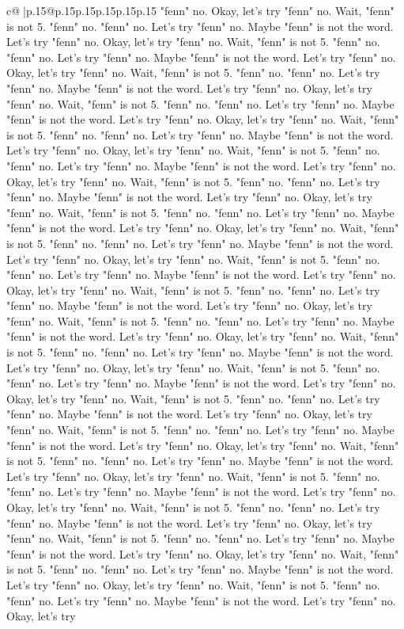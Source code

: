 \documentclass{article}
\begin{document}
{\begin{supertabular}{c@{$\;$}|p{.15\linewidth}@{}p{.15\linewidth}p{.15\linewidth}p{.15\linewidth}p{.15\linewidth}p{.15\linewidth}}
{{{"fenn" no. Okay, let's try "fenn" no. Wait, "fenn" is not 5. "fenn" no. "fenn" no. Let's try "fenn" no. Maybe "fenn" is not the word. Let's try "fenn" no. Okay, let's try "fenn" no. Wait, "fenn" is not 5. "fenn" no. "fenn" no. Let's try "fenn" no. Maybe "fenn" is not the word. Let's try "fenn" no. Okay, let's try "fenn" no. Wait, "fenn" is not 5. "fenn" no. "fenn" no. Let's try "fenn" no. Maybe "fenn" is not the word. Let's try "fenn" no. Okay, let's try "fenn" no. Wait, "fenn" is not 5. "fenn" no. "fenn" no. Let's try "fenn" no. Maybe "fenn" is not the word. Let's try "fenn" no. Okay, let's try "fenn" no. Wait, "fenn" is not 5. "fenn" no. "fenn" no. Let's try "fenn" no. Maybe "fenn" is not the word. Let's try "fenn" no. Okay, let's try "fenn" no. Wait, "fenn" is not 5. "fenn" no. "fenn" no. Let's try "fenn" no. Maybe "fenn" is not the word. Let's try "fenn" no. Okay, let's try "fenn" no. Wait, "fenn" is not 5. "fenn" no. "fenn" no. Let's try "fenn" no. Maybe "fenn" is not the word. Let's try "fenn" no. Okay, let's try "fenn" no. Wait, "fenn" is not 5. "fenn" no. "fenn" no. Let's try "fenn" no. Maybe "fenn" is not the word. Let's try "fenn" no. Okay, let's try "fenn" no. Wait, "fenn" is not 5. "fenn" no. "fenn" no. Let's try "fenn" no. Maybe "fenn" is not the word. Let's try "fenn" no. Okay, let's try "fenn" no. Wait, "fenn" is not 5. "fenn" no. "fenn" no. Let's try "fenn" no. Maybe "fenn" is not the word. Let's try "fenn" no. Okay, let's try "fenn" no. Wait, "fenn" is not 5. "fenn" no. "fenn" no. Let's try "fenn" no. Maybe "fenn" is not the word. Let's try "fenn" no. Okay, let's try "fenn" no. Wait, "fenn" is not 5. "fenn" no. "fenn" no. Let's try "fenn" no. Maybe "fenn" is not the word. Let's try "fenn" no. Okay, let's try "fenn" no. Wait, "fenn" is not 5. "fenn" no. "fenn" no. Let's try "fenn" no. Maybe "fenn" is not the word. Let's try "fenn" no. Okay, let's try "fenn" no. Wait, "fenn" is not 5. "fenn" no. "fenn" no. Let's try "fenn" no. Maybe "fenn" is not the word. Let's try "fenn" no. Okay, let's try "fenn" no. Wait, "fenn" is not 5. "fenn" no. "fenn" no. Let's try "fenn" no. Maybe "fenn" is not the word. Let's try "fenn" no. Okay, let's try "fenn" no. Wait, "fenn" is not 5. "fenn" no. "fenn" no. Let's try "fenn" no. Maybe "fenn" is not the word. Let's try "fenn" no. Okay, let's try "fenn" no. Wait, "fenn" is not 5. "fenn" no. "fenn" no. Let's try "fenn" no. Maybe "fenn" is not the word. Let's try "fenn" no. Okay, let's try "fenn" no. Wait, "fenn" is not 5. "fenn" no. "fenn" no. Let's try "fenn" no. Maybe "fenn" is not the word. Let's try "fenn" no. Okay, let's try "fenn" no. Wait, "fenn" is not 5. "fenn" no. "fenn" no. Let's try "fenn" no. Maybe "fenn" is not the word. Let's try "fenn" no. Okay, let's try "fenn" no. Wait, "fenn" is not 5. "fenn" no. "fenn" no. Let's try "fenn" no. Maybe "fenn" is not the word. Let's try "fenn" no. Okay, let's try "fenn" no. Wait, "fenn" is not 5. "fenn" no. "fenn" no. Let's try "fenn" no. Maybe "fenn" is not the word. Let's try "fenn" no. Okay, let's try "fenn" no. Wait, "fenn" is not 5. "fenn" no. "fenn" no. Let's try "fenn" no. Maybe "fenn" is not the word. Let's try "fenn" no. Okay, let's try }}}
\end{supertabular}}
\end{document}
